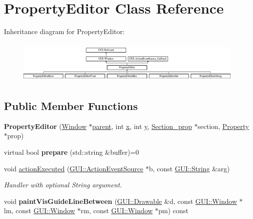 \hypertarget{classPropertyEditor}{\section{Property\-Editor Class Reference}
\label{classPropertyEditor}
}
Inheritance diagram for Property\-Editor\-:\begin{figure}[H]
\begin{center}
\leavevmode
\includegraphics[height=2.123223cm]{classPropertyEditor}
\end{center}
\end{figure}
\subsection*{Public Member Functions}
\begin{DoxyCompactItemize}
\item 
\hypertarget{classPropertyEditor_a151b57c1268c0fe242efda58fba05423}{{\bfseries Property\-Editor} (\hyperlink{classGUI_1_1Window_ae828e9daa964dfc65a3550fb03117d30}{Window} $\ast$\hyperlink{classGUI_1_1Window_a2e593ff65e7702178d82fe9010a0b539}{parent}, int \hyperlink{classGUI_1_1Window_a6ca6a80ca00c9e1d8ceea8d3d99a657d}{x}, int \hyperlink{classGUI_1_1Window_a0ee8e923aff2c3661fc2e17656d37adf}{y}, \hyperlink{classSection__prop}{Section\-\_\-prop} $\ast$section, \hyperlink{classProperty}{Property} $\ast$prop)}\label{classPropertyEditor_a151b57c1268c0fe242efda58fba05423}

\item 
\hypertarget{classPropertyEditor_a5d97100d9b706468b73897870843a7ae}{virtual bool {\bfseries prepare} (std\-::string \&buffer)=0}\label{classPropertyEditor_a5d97100d9b706468b73897870843a7ae}

\item 
void \hyperlink{classPropertyEditor_a216c28dd01d93a55fbd7523c1924d4c7}{action\-Executed} (\hyperlink{classGUI_1_1ActionEventSource}{G\-U\-I\-::\-Action\-Event\-Source} $\ast$b, const \hyperlink{classGUI_1_1String}{G\-U\-I\-::\-String} \&arg)
\begin{DoxyCompactList}\small\item\em Handler with optional String argument. \end{DoxyCompactList}\item 
\hypertarget{classPropertyEditor_a0fadccab8539af31acf24d2aa204e950}{void {\bfseries paint\-Vis\-Guide\-Line\-Between} (\hyperlink{classGUI_1_1Drawable}{G\-U\-I\-::\-Drawable} \&d, const \hyperlink{classGUI_1_1Window}{G\-U\-I\-::\-Window} $\ast$lm, const \hyperlink{classGUI_1_1Window}{G\-U\-I\-::\-Window} $\ast$rm, const \hyperlink{classGUI_1_1Window}{G\-U\-I\-::\-Window} $\ast$pm) const }\label{classPropertyEditor_a0fadccab8539af31acf24d2aa204e950}

\end{DoxyCompactItemize}

